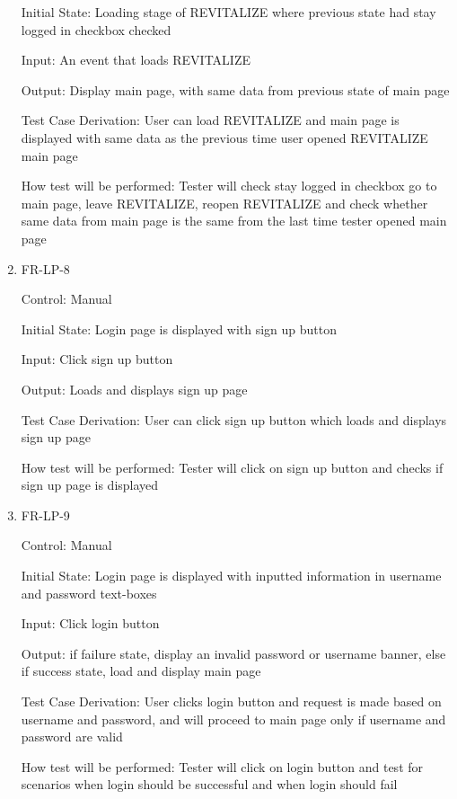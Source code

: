 \documentclass[12pt, titlepage]{article}
\begin{document}
\begin{enumerate}
Initial State: Loading stage of REVITALIZE where previous state had stay logged in checkbox checked
					
Input: An event that loads REVITALIZE
					
Output: Display main page, with same data from previous state of main page

Test Case Derivation: User can load REVITALIZE and main page is displayed with same data as the previous time user opened REVITALIZE main page

How test will be performed: Tester will check stay logged in checkbox go to main page, leave REVITALIZE, reopen REVITALIZE and check whether same data from main page is the same from the last time tester opened main page

\item{FR-LP-8\\}

Control: Manual
					
Initial State: Login page is displayed with sign up button
					
Input: Click sign up button
					
Output: Loads and displays sign up page

Test Case Derivation: User can click sign up button which loads and displays sign up page

How test will be performed: Tester will click on sign up button and checks if sign up page is displayed

\item{FR-LP-9\\}

Control: Manual
					
Initial State: Login page is displayed with inputted information in username and password text-boxes
					
Input: Click login button
					
Output: if failure state, display an invalid password or username banner, else if success state, load and display main page

Test Case Derivation: User clicks login button and request is made based on username and password, and will proceed to main page only if username and password are valid

How test will be performed: Tester will click on login button and test for scenarios when login should be successful and when login should fail


\end{enumerate}
\end{document}
